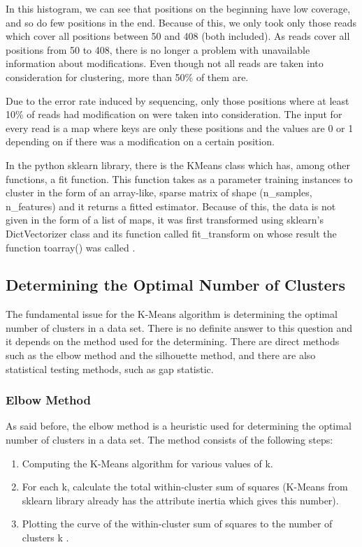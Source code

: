 \documentclass[times, utf8, zavrsni, numeric]{fer}
\begin{document}
In this histogram, we can see that positions on the beginning have low coverage, and so
do few positions in the end. Because of this, we only took only those reads which cover all
positions between 50 and 408 (both included). As reads cover all positions from 50 to 408, there
is no longer a problem with unavailable information about modifications. Even though not all reads 
are taken into consideration for clustering, more than 50\% of them are.

Due to the error rate induced by sequencing, only those positions where at least 10\% of reads
had modification on were taken into consideration. The input for every read is a map where keys 
are only these positions and the values are 0 or 1 depending on if there was a modification on a 
certain position.

In the python sklearn library, there is the KMeans class which has, among other functions, a fit function.
This function takes as a parameter training instances to cluster in the form of an array-like, sparse matrix 
of shape (n\_samples, n\_features) and it returns a fitted estimator. Because of this, the data
is not given in the form of a list of maps, it was first transformed using sklearn's DictVectorizer
class and its function called fit\_transform on whose result the function toarray() was called \cite{dictVectorizer}.

\subsection{Determining the Optimal Number of Clusters}
The fundamental issue for the K-Means algorithm is determining the optimal 
number of clusters in a data set. There is no definite answer to this question and it 
depends on the method used for the determining. 
There are direct methods such as the elbow method and the silhouette method, and there are
also statistical testing methods, such as gap statistic. 

\subsubsection{Elbow Method}
As said before, the elbow method is a heuristic used for determining the optimal number of
clusters in a data set. The method consists of the following steps:
\begin{enumerate}
    \item Computing the K-Means algorithm for various values of k. 
    \item For each k, calculate the total within-cluster sum of squares
    (K-Means from sklearn library already has the attribute inertia which gives this number).
    \item Plotting the curve of the within-cluster sum of squares to the number of clusters k \cite{optimalKmethods}.
\end{enumerate}
\end{document}
